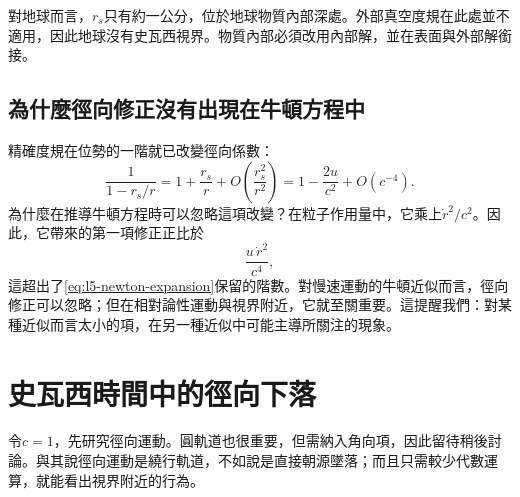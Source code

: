 \begin{classroomqa}
\end{classroomqa}

對地球而言，\(r_s\)只有約一公分，位於地球物質內部深處。外部真空度規在此處並不適用，因此地球沒有史瓦西視界。物質內部必須改用內部解，並在表面與外部解銜接。

\begin{classroomqa}
\end{classroomqa}

\subsection{為什麼徑向修正沒有出現在牛頓方程中}

精確度規在位勢的一階就已改變徑向係數：
\begin{equation}
\frac{1}{1-r_s/r}
=1+\frac{r_s}{r}
+O\!\left(\frac{r_s^2}{r^2}\right)
=1-\frac{2u}{c^2}+O(c^{-4}).
\label{eq:l5-radial-expansion}
\end{equation}
為什麼在推導牛頓方程時可以忽略這項改變？在粒子作用量中，它乘上\(\dot r^2/c^2\)。因此，它帶來的第一項修正正比於
\begin{equation}
\frac{u\,\dot r^2}{c^4},
\end{equation}
這超出了\eqref{eq:l5-newton-expansion}保留的階數。對慢速運動的牛頓近似而言，徑向修正可以忽略；但在相對論性運動與視界附近，它就至關重要。這提醒我們：對某種近似而言太小的項，在另一種近似中可能主導所關注的現象。

\section{史瓦西時間中的徑向下落}

令\(c=1\)，先研究徑向運動。圓軌道也很重要，但需納入角向項，因此留待稍後討論。與其說徑向運動是繞行軌道，不如說是直接朝源墜落；而且只需較少代數運算，就能看出視界附近的行為。

\begin{classroomqa}
\end{classroomqa}

